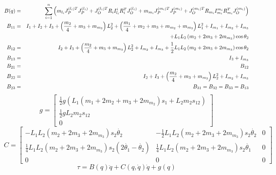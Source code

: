 \documentclass{article}
\begin{document}
\begin{eqnarray*}
	B(q) &=& \sum\limits_{i=1}^{n}  \left( m_{l_i} J_P^{(l_i)T}J_P^{(l_i)} + J_O^{(l_i)T}R_i I^i_{l_i} R_i^T J_O^{(l_i)} + m_{m_i} J_P^{(m_i)T} J_P^{(m_i)} + J_O^{(m_i)T} R_{m_i} I_{m_i}^{m_i} R_{m_i}^T J_O^{(m_i)} \right) \\
	B_{11} &=& I_1 + I_2 + I_3 + \left(\frac{m_2}{4} + m_3 + m_{m_3} \right)L_2^2 + \left( \frac{m_1}{4} + m_2 + m_3 + m_{m_2} + m_{m_3} \right)L_1^2 + I_{m_1} + I_{m_2} + I_{m_3} \\
	& & \hspace{.5in} + L_1 L_2 \left(m_2 + 2 m_3 + 2m_{m_3} \right) \cos \theta_2 \\
	B_{12} &=& I_2 + I_3 + \left( \frac{m_2}{4} + m_3 + m_{m_3} \right)L_2^2 + I_{m_2} + I_{m_3} + \frac{1}{2}L_1 L_2 \left(m_2 + 2m_3 + 2 m_{m_3} \right)\cos\theta_2 \\
	B_{13} &=& I_3 + I_{m_3} \\
	B_{21} &=& B_{12} \\
	B_{22} &=& I_2 + I_3 + \left(\frac{m_2}{4} + m_3 + m_{m_3} \right)L_2^2 + I_{m_2} + I_{m_3} \\
	B_{23} &=& B_{31} = B_{32} = B_{33} = B_{13}
\end{eqnarray*}
\begin{displaymath}
	g = \begin{bmatrix}\frac{1}{2} g \left( L_1 \left(m_1 + 2 m_2 + m_3 + 2 m_{m_2} \right) s_1 + L_2 m_2 s_{12} \right) \\ \frac{1}{2} g L_2 m_2 s_{12} \\ 0 \end{bmatrix}
\end{displaymath}
\begin{displaymath}
	C = \begin{bmatrix} -L_1 L_2 \left(m_2 + 2m_3 + 2m_{m_3} \right)s_2 \dot{\theta_2} & -\frac{1}{2} L_1 L_2 \left(m_2 + 2m_3 + 2m_{m_3} \right) s_2 \dot{\theta_2} & 0 \\ \frac{1}{4} L_1 L_2 \left( m_2 + 2m_3 + 2m_{m_3} \right) s_2 \left(2\dot{\theta_1} - \dot{\theta_2} \right) & \frac{1}{4}L_1 L_2 \left(m_2 + 2m_3 + 2m_{m_3} \right) s_2 \dot{\theta_1} & 0 \\ 0 & 0 & 0 \end{bmatrix}
\end{displaymath}
\begin{displaymath}
	\tau = B(q)\ddot{q} + C(q,\dot{q})\dot{q} + g(q)
\end{displaymath}
\end{document}
